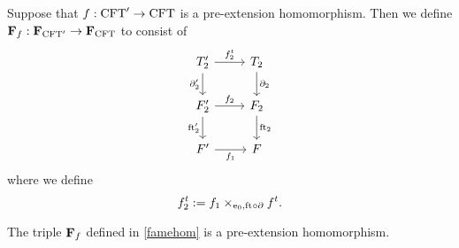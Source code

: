 \begin{defn}\label{famehom}
Suppose that $f:\mathrm{CFT}'\to\mathrm{CFT}$ is a pre-extension homomorphism. Then we
define $\mathbf{F}_{f}:\mathbf{F}_{\mathrm{CFT}'}\to\mathbf{F}_{\mathrm{CFT}}$ to consist of
\begin{equation*}
\begin{tikzcd}
\stesyst_2'
  \ar{r}{f^t_2}
  \ar{d}[swap]{\ebd[2]'}
  &
\stesyst_2
  \ar{d}{\ebd[2]}
  \\
\stesysf_2'
  \ar{r}{f_2}
  \ar{d}[swap]{\eft[2]'}
  &
\stesysf_2
  \ar{d}{\eft[2]}
  \\
\stesysf'
  \ar{r}[swap]{f_1}
  &
\stesysf
\end{tikzcd}
\end{equation*}
where we define
\begin{equation*}
f^t_2 := \pullback{f_1}{f^t}{\ectxext}{\eft\circ\ebd}.
\end{equation*}
\end{defn}

\begin{lem}
The triple $\mathbf{F}_{f}$ defined in \autoref{famehom} is a pre-extension homomorphism.
\end{lem}

